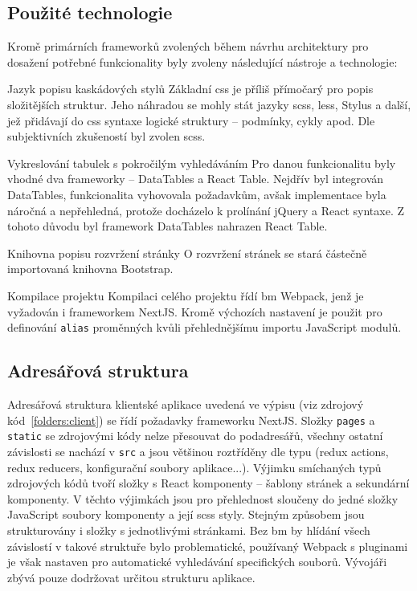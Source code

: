 \subsection{Použité technologie}

Kromě primárních frameworků zvolených během návrhu architektury pro dosažení potřebné funkcionality byly zvoleny následující nástroje a technologie:
\newpage

\begin{dl}
   \item [Jazyk popisu kaskádových stylů] Základní \gls{css} je příliš přímočarý pro popis složitějších struktur. Jeho náhradou se mohly stát jazyky \gls{scss}, \gls{less}, Stylus a další, jež přidávají do \gls{css} syntaxe logické struktury -- podmínky, cykly apod. Dle subjektivních zkušeností byl zvolen \gls{scss}.
   
   \item [Vykreslování tabulek s pokročilým vyhledáváním] Pro danou funkcionalitu byly vhodné dva frameworky -- DataTables a React Table. Nejdřív byl integrován DataTables, funkcionalita vyhovovala požadavkům, avšak implementace byla náročná a nepřehledná, protože docházelo k prolínání jQuery a React syntaxe. Z tohoto důvodu byl framework DataTables nahrazen React Table.
   
   \item [Knihovna popisu rozvržení stránky] O rozvržení stránek se stará částečně importovaná knihovna Bootstrap.
   
   \item [Kompilace projektu] Kompilaci celého projektu řídí \gls{bm} Webpack, jenž je vyžadován i frameworkem NextJS. Kromě výchozích nastavení je použit pro definování \texttt{alias} proměnných kvůli přehlednějšímu importu JavaScript modulů.
\end{dl}



\subsection{Adresářová struktura}

Adresářová struktura klientské aplikace uvedená ve výpisu (viz zdrojový kód~\ref{folders:client}) se řídí požadavky frameworku \mbox{NextJS}. Složky \texttt{pages} a \texttt{static} se zdrojovými kódy nelze přesouvat do podadresářů, všechny ostatní závislosti se nachází v \texttt{src} a jsou většinou roztříděny dle typu (redux actions, redux reducers, konfigurační soubory aplikace...). Výjimku smíchaných typů zdrojových kódů tvoří složky s React komponenty -- šablony stránek a sekundární komponenty. V těchto výjimkách jsou pro přehlednost sloučeny do jedné složky JavaScript soubory komponenty a její \gls{scss} styly. Stejným způsobem jsou strukturovány i složky s jednotlivými stránkami. Bez \gls{bm} by hlídání všech závislostí v takové struktuře bylo problematické, používaný Webpack s pluginami je však nastaven pro automatické vyhledávání specifických souborů. Vývojáři zbývá pouze dodržovat určitou strukturu aplikace.


